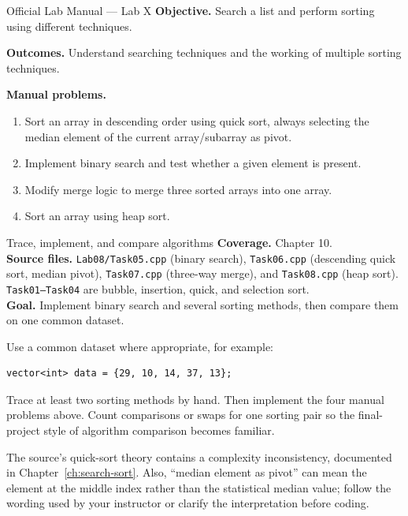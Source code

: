 
\begin{sourcealignment}{Official Lab Manual --- Lab X}
\textbf{Objective.} Search a list and perform sorting using different techniques.

\textbf{Outcomes.} Understand searching techniques and the working of multiple sorting techniques.

\textbf{Manual problems.}
\begin{enumerate}
  \item Sort an array in descending order using quick sort, always selecting the median element of the current array/subarray as pivot.
  \item Implement binary search and test whether a given element is present.
  \item Modify merge logic to merge three sorted arrays into one array.
  \item Sort an array using heap sort.
\end{enumerate}
\end{sourcealignment}

\begin{labproject}{Trace, implement, and compare algorithms}
\textbf{Coverage.} Chapter 10.\\
\textbf{Source files.} \texttt{Lab08/Task05.cpp} (binary search), \texttt{Task06.cpp} (descending quick sort, median pivot), \texttt{Task07.cpp} (three-way merge), and \texttt{Task08.cpp} (heap sort). \texttt{Task01--Task04} are bubble, insertion, quick, and selection sort.\\
\textbf{Goal.} Implement binary search and several sorting methods, then compare them on one common dataset.

Use a common dataset where appropriate, for example:
\begin{lstlisting}
vector<int> data = {29, 10, 14, 37, 13};
\end{lstlisting}

\begin{tryit}
Trace at least two sorting methods by hand. Then implement the four manual problems above. Count comparisons or swaps for one sorting pair so the final-project style of algorithm comparison becomes familiar.
\end{tryit}

\begin{clarification}
The source's quick-sort theory contains a complexity inconsistency, documented in Chapter~\ref{ch:search-sort}. Also, ``median element as pivot'' can mean the element at the middle index rather than the statistical median value; follow the wording used by your instructor or clarify the interpretation before coding.
\end{clarification}
\end{labproject}

